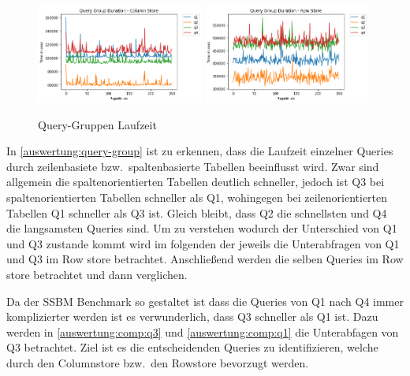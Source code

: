 \begin{figure}[H]
	\centering
	\includegraphics[width=0.49\textwidth]{images/Analysis-SSBM-HANA_18_0.png}
	\includegraphics[width=0.49\textwidth]{images/Analysis-SSBM-HANA_23_0.png}
	\caption{Query-Gruppen Laufzeit}\label{auswertung:query-group}
\end{figure}

In \autoref{auswertung:query-group} ist zu erkennen, dass die
Laufzeit einzelner Queries durch zeilenbasiete bzw.\ spaltenbasierte
Tabellen beeinflusst wird. Zwar sind allgemein die spaltenorientierten Tabellen
deutlich schneller, jedoch ist Q3 bei spaltenorientierten
Tabellen schneller als Q1, wohingegen bei zeilenorientierten Tabellen
Q1 schneller als Q3 ist.
Gleich bleibt, dass Q2 die schnellsten und Q4 die langsamsten Queries sind.
Um zu verstehen wodurch der Unterschied von Q1 und Q3 zustande kommt wird
im folgenden der jeweils die Unterabfragen von Q1 und Q3 im Row store betrachtet.
Anschließend werden die selben Queries im Row store betrachtet und
dann verglichen.

Da der SSBM Benchmark so gestaltet ist dass die Queries
von Q1 nach Q4 immer komplizierter werden ist es verwunderlich,
dass Q3 schneller als Q1 ist.
Dazu werden in \autoref{auswertung:comp:q3} und \autoref{auswertung:comp:q1}
die Unterabfagen von Q3 betrachtet.
Ziel ist es die entscheidenden Queries zu identifizieren, welche
durch den Columnstore bzw.\ den Rowstore bevorzugt werden.

